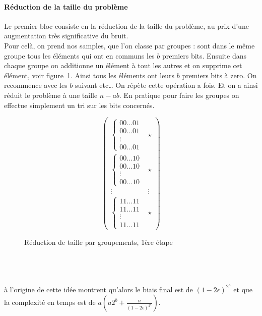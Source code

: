 \documentclass{article}		%
\theoremstyle{definition}
\theoremstyle{plain}
\begin{document}
\paragraph{Réduction de la taille du problème}
Le premier bloc consiste en la réduction de la taille du problème, au
prix d'une augmentation très significative du bruit.
\\
Pour celà, on prend nos samples, que l'on classe par groupes : sont dans
le même groupe tous les éléments qui ont en communs les $b$ premiers bits.
Ensuite dans chaque groupe on additionne un élément à tout les autres et
on supprime cet élément, voir figure~\ref{bbkw}. Ainsi tous les éléments ont leurs $b$ premiers
bits à zero. On recommence avec les $b$ suivant etc\dots
On répète cette opération a fois. Et on a ainsi réduit le problème à une
taille $n-ab$. En pratique pour faire les groupes on effectue simplement
un tri sur les bits concernés.
\begin{figure}
$$\begin{pmatrix}
\begin{cases}00\dots01 \\00\dots01\\ \vdots\\00\dots01 \end{cases} & \star \\
\begin{cases} 00\dots10 \\00\dots10\\ \vdots\\00\dots10  \end{cases} & \star  \\
\vdots & \vdots \\
\begin{cases} 11\dots11 \\11\dots11\\ \vdots\\11\dots11  \end{cases} & \star 
\end{pmatrix}$$
\caption{Réduction de taille par groupements, 1ère étape}
\label{bbkw}
\end{figure}
\\
\\
\\
\cite{BKW} à l'origine de cette idée montrent qu'alors le biais final est
de $(1-2\epsilon)^{2^a}$ et que la complexité en temps est de
$a(a2^b+\frac {n} {(1-2\epsilon)^{2^a}})$.
\end{document}

